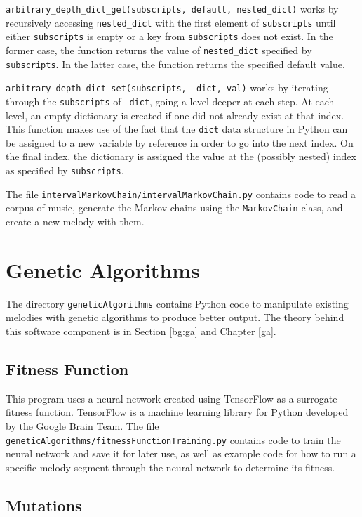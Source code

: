 \texttt{arbitrary\_depth\_dict\_get(subscripts, default, nested\_dict)} works by recursively accessing \texttt{nested\_dict} with the first element of \texttt{subscripts} until either \texttt{subscripts} is empty or a key from \texttt{subscripts} does not exist.
In the former case, the function returns the value of \texttt{nested\_dict} specified by \texttt{subscripts}.
In the latter case, the function returns the specified default value.

\texttt{arbitrary\_depth\_dict\_set(subscripts, \_dict, val)} works by iterating through the \texttt{subscripts} of \texttt{\_dict}, going a level deeper at each step.
At each level, an empty dictionary is created if one did not already exist at that index.
This function makes use of the fact that the \texttt{dict} data structure in Python can be assigned to a new variable by reference in order to go into the next index.
On the final index, the dictionary is assigned the value at the (possibly nested) index as specified by \texttt{subscripts}.

The file \texttt{intervalMarkovChain/intervalMarkovChain.py} contains code to read a corpus of music, generate the Markov chains using the \texttt{MarkovChain} class, and create a new melody with them.

\section{Genetic Algorithms}

The directory \texttt{geneticAlgorithms} contains Python code to manipulate existing melodies with genetic algorithms to produce better output.
The theory behind this software component is in Section \ref{bg:ga} and Chapter \ref{ga}.

\subsection{Fitness Function}

This program uses a neural network created using TensorFlow as a surrogate fitness function.
TensorFlow is a machine learning library for Python developed by the Google Brain Team.
The file \texttt{geneticAlgorithms/fitnessFunctionTraining.py} contains code to train the neural network and save it for later use, as well as example code for how to run a specific melody segment through the neural network to determine its fitness.

\subsection{Mutations}

